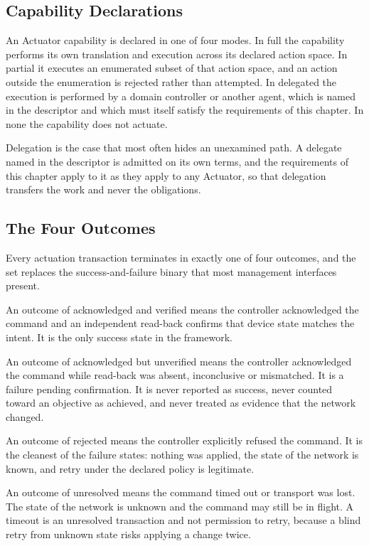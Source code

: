 \hypertarget{capability-declarations-3}{%
\subsection{Capability Declarations}\label{capability-declarations-3}}

An Actuator capability is declared in one of four modes. In full the
capability performs its own translation and execution across its
declared action space. In partial it executes an enumerated subset of
that action space, and an action outside the enumeration is rejected
rather than attempted. In delegated the execution is performed by a
domain controller or another agent, which is named in the descriptor and
which must itself satisfy the requirements of this chapter. In none the
capability does not actuate.

Delegation is the case that most often hides an unexamined path. A
delegate named in the descriptor is admitted on its own terms, and the
requirements of this chapter apply to it as they apply to any Actuator,
so that delegation transfers the work and never the obligations.

\hypertarget{the-four-outcomes}{%
\subsection{The Four Outcomes}\label{the-four-outcomes}}

Every actuation transaction terminates in exactly one of four outcomes,
and the set replaces the success-and-failure binary that most management
interfaces present.

An outcome of acknowledged and verified means the controller
acknowledged the command and an independent read-back confirms that
device state matches the intent. It is the only success state in the
framework.

An outcome of acknowledged but unverified means the controller
acknowledged the command while read-back was absent, inconclusive or
mismatched. It is a failure pending confirmation. It is never reported
as success, never counted toward an objective as achieved, and never
treated as evidence that the network changed.

An outcome of rejected means the controller explicitly refused the
command. It is the cleanest of the failure states: nothing was applied,
the state of the network is known, and retry under the declared policy
is legitimate.

An outcome of unresolved means the command timed out or transport was
lost. The state of the network is unknown and the command may still be
in flight. A timeout is an unresolved transaction and not permission to
retry, because a blind retry from unknown state risks applying a change
twice.

